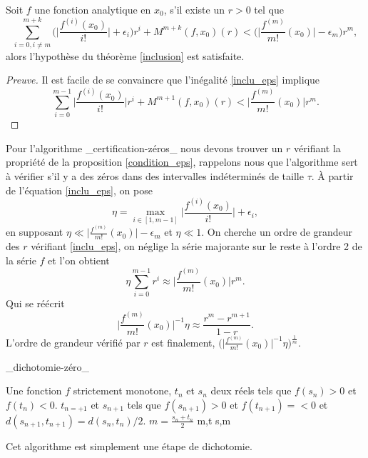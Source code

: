 \documentclass[a4paper,10pt]{article}
\begin{document}
	\begin{proposition}
		Soit $f$ une fonction analytique en $x_0$, s'il existe un $r>0$ tel que 
		\begin{equation}
			\sum_{i=0, i \neq m}^{m+k}\Big(\Big|\frac{f^{(i)}(x_0)}{i!}\Big|+\epsilon_i\Big)r^i+M^{m+k}(f,x_0)(r)<\Big(\Big|\frac{f^{(m)}}{m!}(x_0)\Big|-\epsilon_m\Big)r^{m},
		\label{inclu_eps}
		\end{equation}
		alors l'hypothèse du théorème \ref{inclusion} est satisfaite.
		\label{condition_eps}
	\end{proposition}
	\begin{proof}[Preuve]
		Il est facile de se convaincre que l'inégalité \eqref{inclu_eps} implique
		\[\sum_{i=0}^{m-1}\Big|\frac{f^{(i)}(x_0)}{i!}\Big|r^i+M^{m+1}(f,x_0)(r)<\Big|\frac{f^{(m)}}{m!}(x_0)\Big|r^{m}.\]
	\end{proof}
	
	\begin{remarque}
		Pour l'algorithme \_certification-zéros\_ nous devons trouver un $r$ vérifiant la propriété de la proposition \eqref{condition_eps}, rappelons nous que l'algorithme sert à vérifier s'il y a des zéros dans des intervalles indéterminés de taille $\tau$. À partir de l'équation \eqref{inclu_eps}, on pose \[\eta=\max_{i \in [1,m-1]}\Big|\frac{f^{(i)}(x_0)}{i!}\Big|+\epsilon_i,\]
		en supposant $\eta \ll \Big|\frac{f^{(m)}}{m!}(x_0)\Big|-\epsilon_m$ et $\eta \ll 1$.
		On cherche un ordre de grandeur des $r$ vérifiant  \eqref{inclu_eps}, on néglige la série majorante sur le reste à l'ordre 2 de la série $f$ et l'on obtient
		\[\eta \sum_{i=0}^{m-1}r^i\approx \Big|\frac{f^{(m)}}{m!}(x_0)\Big|r^m.\]
		Qui se réécrit
		\[\Big|\frac{f^{(m)}}{m!}(x_0)\Big|^{-1}\eta \approx\frac{r^m-r^{m+1}}{1-r}.\]
		L'ordre de grandeur vérifié par $r$ est finalement, $\Big(\Big|\frac{f^{(m)}}{m!}(x_0)\Big|^{-1}\eta\Big)^{\frac{1}{m}}$. 
	\end{remarque}

	\begin{algorithm}
		\caption{\_dichotomie-zéro\_}
		\begin{algorithmic}[1]
			\REQUIRE Une fonction $f$ strictement monotone, $t_n$ et $s_n$ deux réels tels que $f(s_{n})>0$ et $f(t_{n})<0$.
			\ENSURE $t_{n=+1}$ et $s_{n+1}$ tels que  $f(s_{n+1})>0$ et $f(t_{n+1})=<0$ et $d(s_{n+1},t_{n+1})=d(s_{n},t_{n})/2$.
			\STATE $m=\frac{s_n+t_n}{2}$
			\RETURN m,t 
			\ELSE
			\RETURN s,m
			\ENDIF
		\end{algorithmic}
		\label{dichotomie-zero}
	\end{algorithm}
	Cet algorithme est simplement une étape de dichotomie.
		
\end{document}

